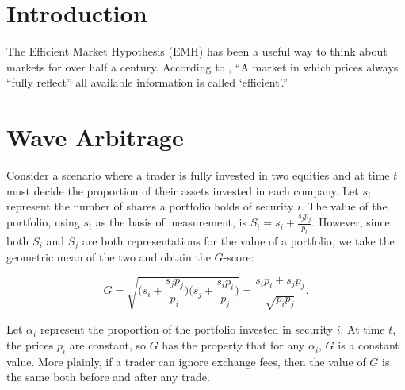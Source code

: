 \documentclass[10pt]{article}
\title{\thetitle}
\author{Logan P.~Evans \texttt{(loganpevans@gmail.com)}}
\date{}
\begin{document}
\begin{multicols}{2}
\maketitle

\begin{abstract}
  \noindent
  We present the $G$-score for a portfolio and develop a trading strategy for
  which this value monotonically increases. We show that the expected value of
  this algorithm has a higher expected value than a buy-and-hold strategy,
  which is a contradiction to the Efficient Market Hypothesis.
\end{abstract}

\section{Introduction}

The Efficient Market Hypothesis (EMH) has been a useful way to think about
markets for over half a century. According to \citet{fama1970}, ``A market in
which prices always “fully reflect” all available information is called
`efficient'.''

\section{Wave Arbitrage}

Consider a scenario where a trader is fully invested in two equities and at
time $t$ must decide the proportion of their assets invested in each company.
Let $s_i$ represent the number of shares a portfolio holds of security $i$. The
value of the portfolio, using $s_i$ as the basis of measurement, is $S_i = s_i
+ \frac{s_j p_j}{p_i}$. However, since both $S_i$ and $S_j$ are both
representations for the value of a portfolio, we take the geometric mean of the
two and obtain the $G$-score:

\begin{equation}
\label{eq:g_def}
  G = \sqrt{ \bigg( s_i + \frac{s_j p_j}{p_i} \bigg)
             \bigg( s_j + \frac{s_i p_i}{p_j} \bigg)
           }
    = \frac{s_i p_i + s_j p_j}{\sqrt{p_i p_j}}.
\end{equation}

Let $\alpha_i$ represent the proportion of the portfolio invested in security
$i$. At time $t$, the prices $p_i$ are constant, so $G$ has the property that
for any $\alpha_i$, $G$ is a constant value. More plainly, if a trader can
ignore exchange fees, then the value of $G$ is the same both before and after
any trade.


\end{multicols}
\end{document}
